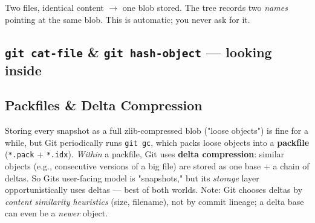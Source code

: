 \documentclass[11pt]{article}
\newenvironment{Shaded}{\begin{snugshade}}{\end{snugshade}}
\newcommand{\AttributeTok}[1]{\textcolor[rgb]{0.16,0.50,0.73}{#1}}
\newcommand{\CommentTok}[1]{\textcolor[rgb]{0.48,0.49,0.49}{#1}}
\newcommand{\ExtensionTok}[1]{\textcolor[rgb]{0.00,0.60,1.00}{\textbf{#1}}}
\newcommand{\FunctionTok}[1]{\textcolor[rgb]{0.56,0.27,0.68}{#1}}
\newcommand{\KeywordTok}[1]{\textcolor[rgb]{0.81,0.81,0.76}{\textbf{#1}}}
\newcommand{\NormalTok}[1]{\textcolor[rgb]{0.81,0.81,0.76}{#1}}
\newcommand{\StringTok}[1]{\textcolor[rgb]{0.96,0.31,0.31}{#1}}
\begin{document}
Two files, identical content \(\rightarrow\) one blob stored. The tree records two \emph{names} pointing at the same blob. This is automatic; you never ask for it.

\subsection{\texorpdfstring{\texttt{git\ cat-file} \& \texttt{git\ hash-object} --- looking inside}{git cat-file \& git hash-object --- looking inside}}\label{git-cat-file--git-hash-object--looking-inside}


\begin{Shaded}
\end{Shaded}

\subsection{Packfiles \& Delta Compression}\label{packfiles--delta-compression}

Storing every snapshot as a full zlib-compressed blob ("loose objects") is fine for a while, but Git periodically runs \texttt{git\ gc}, which packs loose objects into a \textbf{packfile} (\texttt{*.pack} + \texttt{*.idx}). \emph{Within} a packfile, Git uses \textbf{delta compression}: similar objects (e.g., consecutive versions of a big file) are stored as one base + a chain of deltas. So Git\textquotesingle s user-facing model is "snapshots," but its \emph{storage} layer opportunistically uses deltas --- best of both worlds. Note: Git chooses deltas by \emph{content similarity heuristics} (size, filename), not by commit lineage; a delta base can even be a \emph{newer} object.
\end{document}
